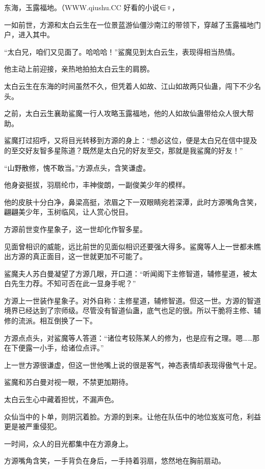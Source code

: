 
\begin{this_body}

东海，玉露福地。（WWW.qiushu.CC 好看的小说∈♀，

一如前世，方源和太白云生在一位景蓝游仙僵沙南江的带领下，穿越了玉露福地门户，进入其中。

“太白兄，咱们又见面了。哈哈哈！”鲨魔见到太白云生，表现得相当热情。

他主动上前迎接，亲热地拍拍太白云生的肩膀。

太白云生在东海的时间虽然不久，但凭着人如故、江山如故两只仙蛊，闯下不少名头。

之前，太白云生襄助鲨魔一行人攻略玉露福地，他的人如故仙蛊带给众人很大帮助。

鲨魔打过招呼，又将目光转移到方源的身上：“想必这位，便是太白兄在信中提及的至交好友智多星陈道？既然是太白兄的好友至交，那就是我鲨魔的好友！”

“山野散修，愧不敢当。”方源点头，含笑谦虚。

他身姿挺拔，羽扇纶巾，丰神俊朗，一副俊美少年的模样。

他的皮肤十分白净，鼻梁高挺，浓眉之下一双眼睛宛若深潭，此时方源嘴角含笑，翩翩美少年，玉树临风，让人赏心悦目。

方源前世变作星象子，这一世却化作智多星。

见面曾相识的威能，远比前世的见面似相识还要强大得多。鲨魔等人上一世都未瞧出方源的真正面目，这一世就更加不可能了。

鲨魔夫人苏白曼凝望了方源几眼，开口道：“听闻阁下主修智道，辅修星道，被太白先生力荐。不知可否在此一显身手呢？”

方源上一世装作星象子。对外自称：主修星道，辅修智道。但这一世。方源的智道境界已经达到了宗师级。尽管没有智道仙蛊，底气也足的很。所以干脆将主修、辅修的流派。相互倒换了一下。

方源点点头，对鲨魔等人答道：“诸位考较陈某人的修为，也是应有之理。嗯……那在下便露一小手，给诸位点评。”

上一世方源很谦虚，但这一世他嘴上说的很是客气，神态表情却表现得傲气十足。

鲨魔和苏白曼对视一眼，不禁更加期待。

太白云生心中藏着担忧，不漏声色。

众仙当中的卜单，则阴沉着脸。方源的到来。让他在队伍中的地位岌岌可危，利益更是被严重侵犯。

一时间，众人的目光都集中在方源身上。

方源嘴角含笑，一手背负在身后，一手持着羽扇，悠然地在胸前扇动。


\end{this_body}
